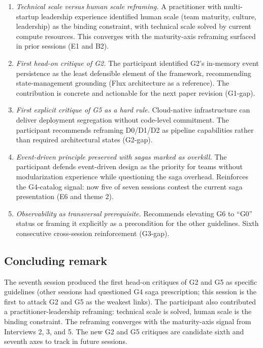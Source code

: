 \begin{enumerate}[itemsep=3pt,topsep=2pt]
  \item \emph{Technical scale versus human scale reframing.} A practitioner with multi-startup leadership experience identified human scale (team maturity, culture, leadership) as the binding constraint, with technical scale solved by current compute resources. This converges with the maturity-axis reframing surfaced in prior sessions (E1 and B2).
  \item \emph{First head-on critique of G2.} The participant identified G2's in-memory event persistence as the least defensible element of the framework, recommending state-management grounding (Flux architecture as a reference). The contribution is concrete and actionable for the next paper revision (G1-gap).
  \item \emph{First explicit critique of G5 as a hard rule.} Cloud-native infrastructure can deliver deployment segregation without code-level commitment. The participant recommends reframing D0/D1/D2 as pipeline capabilities rather than required architectural states (G2-gap).
  \item \emph{Event-driven principle preserved with sagas marked as overkill.} The participant defends event-driven design as the priority for teams without modularization experience while questioning the saga overhead. Reinforces the G4-catalog signal: now five of seven sessions contest the current saga presentation (E6 and theme 2).
  \item \emph{Observability as transversal prerequisite.} Recommends elevating G6 to ``G0'' status or framing it explicitly as a precondition for the other guidelines. Sixth consecutive cross-session reinforcement (G3-gap).
\end{enumerate}

\subsection*{Concluding remark}

The seventh session produced the first head-on critiques of G2 and G5 as specific guidelines (other sessions had questioned G4 saga prescription; this session is the first to attack G2 and G5 as the weakest links). The participant also contributed a practitioner-leadership reframing: technical scale is solved, human scale is the binding constraint. The reframing converges with the maturity-axis signal from Interviews 2, 3, and 5. The new G2 and G5 critiques are candidate sixth and seventh axes to track in future sessions.
